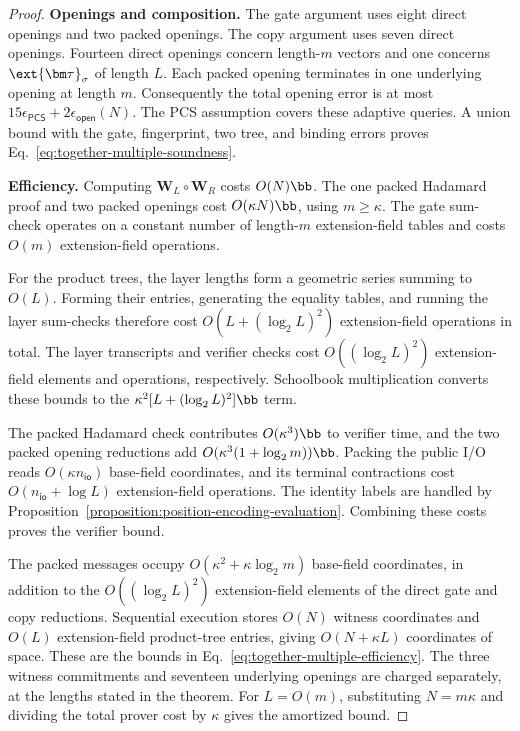\begin{proof}
\smallskip\noindent\textbf{Openings and composition.}
The gate argument uses eight direct openings and two packed
openings. The copy argument uses seven direct openings.
Fourteen direct openings concern length-\(m\) vectors and
one concerns \(\ext{\bm\tau}_\sigma\) of length \(L\).
Each packed opening terminates in one underlying opening at
length \(m\). Consequently the total opening error is at most
\(15\epsilon_{\mathsf{PCS}}+2\epsilon_{\mathsf{open}}(N)\).
The PCS assumption covers these adaptive queries.
A union bound with the gate, fingerprint, two tree, and binding
errors proves Eq.~\eqref{eq:together-multiple-soundness}.

\smallskip\noindent\textbf{Efficiency.}
Computing \(\bm W_L\circ\bm W_R\) costs \(O(N)\bb\).
The one packed Hadamard proof and two packed openings cost
\(O(\kappa N)\bb\), using \(m\geq\kappa\).
The gate sum-check operates on a constant number of
length-\(m\) extension-field tables and costs
\(O(m)\) extension-field operations.

For the product trees, the layer lengths form a geometric
series summing to \(O(L)\). Forming their entries, generating
the equality tables, and running the layer sum-checks therefore
cost \(O(L+(\log_2L)^2)\) extension-field operations in total.
The layer transcripts and verifier checks cost
\(O((\log_2L)^2)\) extension-field elements and operations,
respectively.
Schoolbook multiplication converts these bounds to the
\(\kappa^2[L+(\log_2L)^2]\bb\) term.

The packed Hadamard check contributes \(O(\kappa^3)\bb\)
to verifier time, and the two packed opening reductions add
\(O(\kappa^3(1+\log_2m))\bb\).
Packing the public I/O reads \(O(\kappa n_{\mathsf{io}})\)
base-field coordinates, and its terminal contractions cost
\(O(n_{\mathsf{io}}+\log L)\) extension-field operations.
The identity labels are handled by
Proposition~\ref{proposition:position-encoding-evaluation}.
Combining these costs proves the verifier bound.

The packed messages occupy \(O(\kappa^2+\kappa\log_2m)\)
base-field coordinates, in addition to the
\(O((\log_2L)^2)\) extension-field elements of the direct
gate and copy reductions.
Sequential execution stores \(O(N)\) witness coordinates and
\(O(L)\) extension-field product-tree entries, giving
\(O(N+\kappa L)\) coordinates of space.
These are the bounds in
Eq.~\eqref{eq:together-multiple-efficiency}.
The three witness commitments and seventeen underlying openings
are charged separately, at the lengths stated in the theorem.
For \(L=O(m)\), substituting \(N=m\kappa\) and dividing the
total prover cost by \(\kappa\) gives the amortized bound.
\end{proof}
